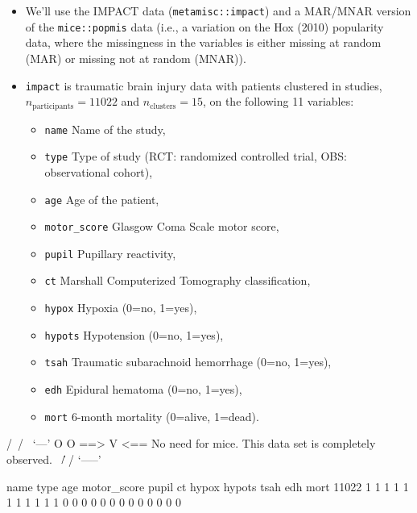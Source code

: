 \documentclass[
]{jss}
\providecommand{\tightlist}{%
  \setlength{\itemsep}{0pt}\setlength{\parskip}{0pt}}
\begin{document}
\begin{itemize}
\item
  We'll use the IMPACT data (\texttt{metamisc::impact}) and a MAR/MNAR
  version of the \texttt{mice::popmis} data (i.e., a variation on the
  Hox (2010) popularity data, where the missingness in the variables is
  either missing at random (MAR) or missing not at random (MNAR)).
\item
  \texttt{impact} is traumatic brain injury data with patients clustered
  in studies, \(n_{\text{participants}} = 11022\) and
  \(n_{\text{clusters}} = 15\), on the following 11 variables:

  \begin{itemize}
  \tightlist
  \item
    \texttt{name} Name of the study,
  \item
    \texttt{type} Type of study (RCT: randomized controlled trial, OBS:
    observational cohort),
  \item
    \texttt{age} Age of the patient,
  \item
    \texttt{motor\_score} Glasgow Coma Scale motor score,
  \item
    \texttt{pupil} Pupillary reactivity,
  \item
    \texttt{ct} Marshall Computerized Tomography classification,
  \item
    \texttt{hypox} Hypoxia (0=no, 1=yes),
  \item
    \texttt{hypots} Hypotension (0=no, 1=yes),
  \item
    \texttt{tsah} Traumatic subarachnoid hemorrhage (0=no, 1=yes),
  \item
    \texttt{edh} Epidural hematoma (0=no, 1=yes),
  \item
    \texttt{mort} 6-month mortality (0=alive, 1=dead).
  \end{itemize}
\end{itemize}

\begin{CodeChunk}
\begin{CodeOutput}
 /\     /\
{  `---'  }
{  O   O  }
==>  V <==  No need for mice. This data set is completely observed.
 \  \|/  /
  `-----'
\end{CodeOutput}
\begin{CodeOutput}
      name type age motor_score pupil ct hypox hypots tsah edh mort  
11022    1    1   1           1     1  1     1      1    1   1    1 0
         0    0   0           0     0  0     0      0    0   0    0 0
\end{CodeOutput}
\end{CodeChunk}
\end{document}
